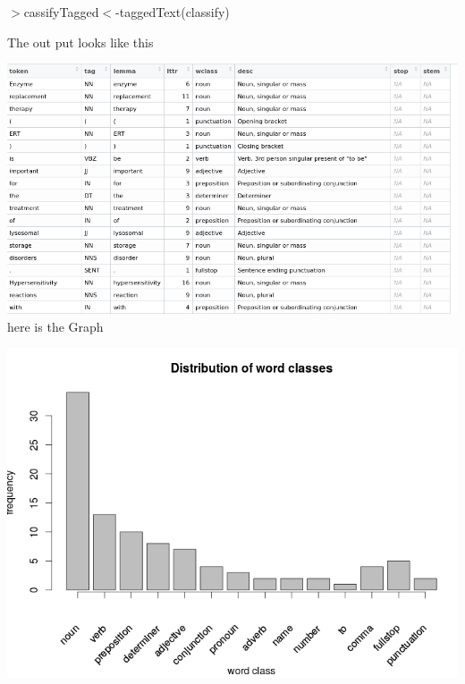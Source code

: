 \documentclass{article}
\begin{document}
$>$cassifyTagged$<$-taggedText(classify)

The out put looks like this

\includegraphics[width=0.8\linewidth]{Korpus1.png}\\
here is the Graph

\includegraphics[width=0.8\linewidth]{korpus2.png}
\end{document}
